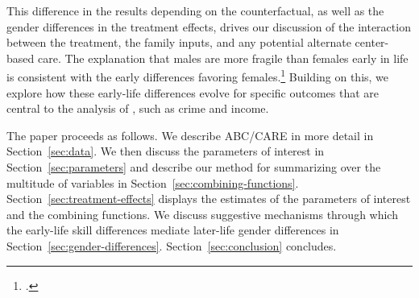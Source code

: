 This difference in the results depending on the counterfactual, as well as the gender differences in the treatment effects, drives our discussion of the interaction between the treatment, the family inputs, and any potential alternate center-based care. The explanation that males are more fragile than females early in life is consistent with the early differences favoring females.\footnote{\citet{Kottelenberg-Lehrer_2014_Gender-Effects,Baker_Gruber_Milligan_2015_Noncog_Defects, Schore_2017_IMHJ}.} Building on this, we explore how these early-life differences evolve for specific outcomes that are central to the analysis of  \citet{Garcia_etal_2016_Comp_CBA_Unpublished}, such as crime and income.

The paper proceeds as follows. We describe ABC/CARE in more detail in Section~\ref{sec:data}. We then discuss the parameters of interest in Section~\ref{sec:parameters} and describe our method for summarizing over the multitude of variables in Section~\ref{sec:combining-functions}. Section~\ref{sec:treatment-effects} displays the estimates of the parameters of interest and the combining functions. We discuss suggestive mechanisms through which the early-life skill differences mediate later-life gender differences in Section~\ref{sec:gender-differences}. Section~\ref{sec:conclusion} concludes.

